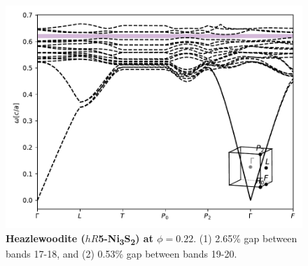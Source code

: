 \documentclass[fleqn,amsmath,amssymb,superscriptaddress, reprint,prl]{revtex4-1}
\begin{document}
\begin{figure}
\includegraphics[width=0.9\linewidth]{workspace/419ab150d81de4e637b0c6c09e744e0a/images/r=22.pdf}
	\caption{\textbf{Heazlewoodite ($hR$5-Ni\textsubscript{3}S\textsubscript{2}) at $\phi=0.22$}. (1) 2.65\% gap between bands 17-18, and (2) 0.53\% gap between bands 19-20.}
\end{figure}
\end{document}
